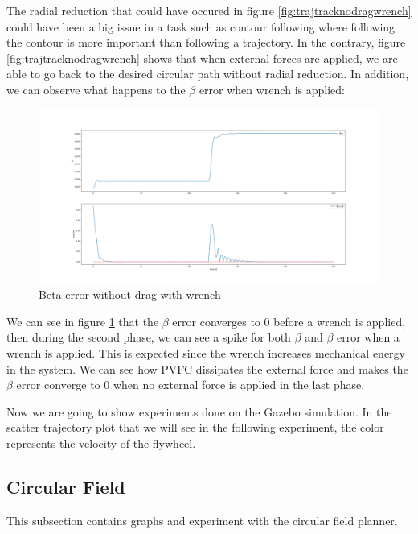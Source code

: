 The radial reduction that could have occured in figure \ref{fig:trajtracknodragwrench} could have been a big issue in a task such as contour following where following the contour is more important than following a trajectory.
In the contrary, figure \ref{fig:trajtracknodragwrench} shows that when external forces are applied, we are able to go back to the desired circular path without radial reduction.
In addition, we can observe what happens to the $\beta$ error when wrench is applied:
\begin{figure}[h!]
   \centering
   \includegraphics[width=\linewidth, scale=1.5]{Images/betaerrornodragwrench.png}
   \caption{Beta error without drag with wrench}
   \label{fig:betaerrornodragwrench}
\end{figure}
We can see in figure \ref{fig:betaerrornodragwrench} that the $\beta$ error converges to 0 before a wrench is applied, 
then during the second phase, we can see a spike for both $\beta$ and $\beta$ error when a wrench is applied. This is expected since the wrench increases mechanical energy in the system. 
We can see how PVFC dissipates the external force and makes the $\beta$ error converge to 0 when no external force is applied in the last phase.

Now we are going to show experiments done on the Gazebo simulation.
In the scatter trajectory plot that we will see in the following experiment, the color represents the velocity of the flywheel.
\subsection{Circular Field}
This subsection contains graphs and experiment with the circular field planner.
